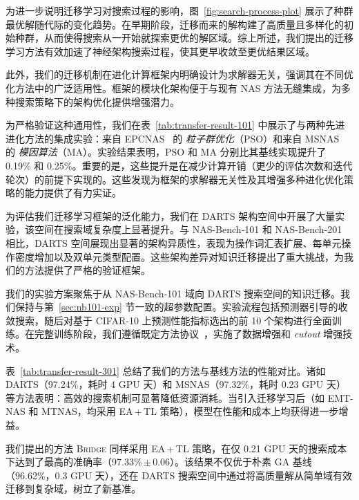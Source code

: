 \documentclass[../main.tex]{subfiles}
\begin{document}
为进一步说明迁移学习对搜索过程的影响，图~\ref{fig:search-process-plot} 展示了种群最优解随代际的变化趋势。在早期阶段，迁移而来的解构建了高质量且多样化的初始种群，从而使得搜索从一开始就探索更优的解区域。综上所述，我们提出的迁移学习方法有效加速了神经架构搜索过程，使其更早收敛至更优结果区域。

此外，我们的迁移机制在进化计算框架内明确设计为求解器无关，强调其在不同优化方法中的广泛适用性。框架的模块化架构便于与现有 NAS 方法无缝集成，为多种搜索策略下的架构优化提供增强潜力。

为严格验证这种通用性，我们在表~\ref{tab:transfer-result-101} 中展示了与两种先进进化方法的集成实验：来自 EPCNAS~\cite{splitlevelevolutionary_huang_2023} 的 \textit{粒子群优化}（PSO）和来自 MSNAS~\cite{cellbasedfast_dong_2023} 的 \textit{模因算法}（MA）。实验结果表明，PSO 和 MA 分别比其基线实现提升了 0.19\% 和 0.25\%。重要的是，这些提升是在减少计算开销（更少的评估次数和迭代轮次）的前提下实现的。这些发现为框架的求解器无关性及其增强多种进化优化策略的能力提供了有力实证。

\label{sec:ch4-8-4-transfer-to-challenging-domains}

为评估我们迁移学习框架的泛化能力，我们在 DARTS 架构空间中开展了大量实验，该空间在搜索域复杂度上显著提升。与 NAS-Bench-101 和 NAS-Bench-201 相比，DARTS 空间展现出显著的架构异质性，表现为操作词汇表扩展、每单元操作密度增加以及双单元类型配置。这些架构差异对知识迁移提出了重大挑战，为我们的方法提供了严格的验证框架。

我们的实验方案聚焦于从 NAS-Bench-101 域向 DARTS 搜索空间的知识迁移。我们保持与第~\ref{sec:nb101-exp} 节一致的超参数配置。实验流程包括预测器引导的收敛搜索，随后对基于 CIFAR-10 上预测性能指标选出的前 10 个架构进行全面训练。在完整训练阶段，我们遵循既定方法协议~\cite{regularizedevolutionimage_real_2019,learningtransferablearchitectures_zoph_2018,efficientneuralarchitecture_pham_2018,dartsdifferentiablearchitecture_liu_2019,cellbasedfast_dong_2023}，实施了数据增强和 \textit{cutout} 增强技术。

表~\ref{tab:transfer-result-301} 总结了我们的方法与基线方法的性能对比。诸如 DARTS（97.24\%，耗时 4 GPU 天）和 MSNAS（97.32\%，耗时 0.23 GPU 天）等方法表明：高效的搜索机制可显著降低资源消耗。当引入迁移学习后（如 EMT-NAS 和 MTNAS，均采用 EA\,+\,TL 策略），模型在性能和成本上均获得进一步增益。

我们提出的方法 \textsc{Bridge} 同样采用 EA\,+\,TL 策略，在仅 0.21 GPU 天的搜索成本下达到了最高的准确率（97.33\%\,\(\pm\)\,0.06）。该结果不仅优于朴素 GA 基线（96.62\%，0.3 GPU 天），还在 DARTS 搜索空间中通过将高质量解从简单域有效迁移到复杂域，树立了新基准。
\end{document}
